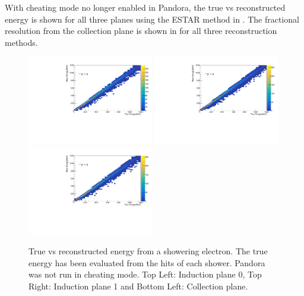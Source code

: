 With cheating mode no longer enabled in Pandora, the true vs reconstructed energy is shown for all three planes using the ESTAR method in . The fractional resolution from the collection plane is shown in  for all three reconstruction methods.

\begin{figure}[h!]
    \centering
    \includegraphics[width = 0.49\textwidth]{figures-chap4/non_cheat/ESTAR_plane0_true_vs_reco.pdf}
    \includegraphics[width = 0.49\textwidth]{figures-chap4/non_cheat/ESTAR_plane1_true_vs_reco.pdf}
    \includegraphics[width = 0.49\textwidth]{figures-chap4/non_cheat/ESTAR_plane2_true_vs_reco.pdf}
    \captionsetup{width=0.45\textwidth}
    \parbox[b]{0.49\textwidth}%
    {
    \caption[True vs reconstructed energy from the ESTAR method without using Pandora in cheating mode.]
    {True vs reconstructed energy from a showering electron. The true energy has been evaluated from the hits of each shower. Pandora was not run in cheating mode. Top Left: Induction plane 0, Top Right: Induction plane 1 and Bottom Left: Collection plane. \\}
    \label{fig:ESTAR_true_vs_reco_no_cheat}}
\end{figure}

